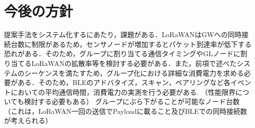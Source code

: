 \section{今後の方針}
提案手法をシステム化するにあたり，課題がある．LoRaWANはGWへの同時接続台数に制限があるため，センサノードが増加するとパケット到達率が低下する恐れがある．そのため，グループに割り当てる通信タイミングやGLノードに割り当てるLoRaWANの拡散率等を検討する必要がある．また，前項で述べたシステムのシーケンスを満たすため，グループ化における詳細な消費電力を求める必要がある．そのため，BLEのアドバタイズ，スキャン，ペアリングなど各イベントにおいての平均通信時間，消費電力の実測を行う必要がある.
（性能限界についても検討する必要もある）
グループにぶら下がることが可能なノード台数（これは，LoRaWAN一回の送信でPayloadに載ること及びBLEでの同時接続数が考えられる）